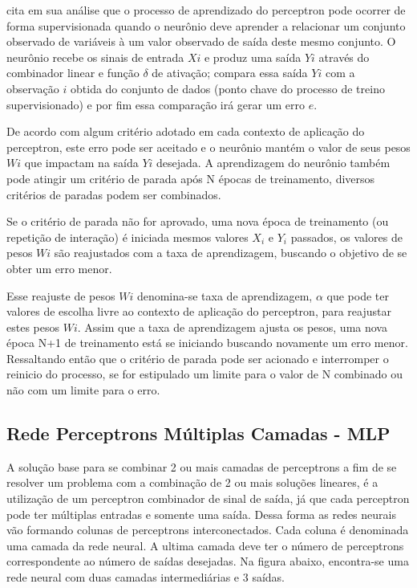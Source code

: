 \cite{Almeida2013} cita em sua análise que o processo de aprendizado do perceptron pode ocorrer de forma supervisionada quando o neurônio deve aprender a relacionar um conjunto observado de variáveis à um valor observado de saída deste mesmo conjunto. O neurônio recebe os sinais de entrada $Xi$ e produz uma saída $Yi$ através do combinador linear e função $\delta$ de ativação; compara essa saída $Yi$ com a observação $i$ obtida do conjunto de dados (ponto chave do processo de treino supervisionado) e por fim essa comparação irá gerar um erro $e$.
            
De acordo com algum critério adotado em cada contexto de aplicação do perceptron, este erro pode ser aceitado e o neurônio mantém o valor de seus pesos $Wi$ que impactam na saída $Yi$ desejada. A aprendizagem do neurônio também pode atingir um critério de parada após N épocas de treinamento, diversos critérios de paradas  podem ser combinados.  
            	
Se o critério de parada não for aprovado, uma nova época de treinamento (ou repetição de interação) é iniciada mesmos valores $X_i$ e $Y_i$ passados, os valores de pesos $Wi$ são reajustados com a taxa de aprendizagem, buscando o objetivo de se obter um erro menor.
            	
Esse reajuste de pesos $Wi$ denomina-se taxa de aprendizagem, $\alpha$ que pode ter valores de escolha livre ao contexto de aplicação do perceptron, para reajustar estes pesos $Wi$. Assim que a taxa de aprendizagem ajusta os pesos, uma nova época N+1 de treinamento está se iniciando buscando novamente um erro menor. Ressaltando então que o critério de parada pode ser acionado e interromper o reinicio do processo, se for estipulado um limite para o valor de N combinado ou não com um limite para o erro. 
            	
\subsection{Rede Perceptrons Múltiplas Camadas - MLP}
  	       
  	       A solução base para se combinar 2 ou mais camadas de perceptrons a fim de se resolver um problema com a combinação de 2 ou mais soluções lineares, é a utilização de um perceptron combinador de sinal de saída, já que cada perceptron pode ter múltiplas entradas e somente uma saída. Dessa forma as redes neurais vão formando colunas de perceptrons interconectados. Cada coluna é denominada uma camada da rede neural. A ultima camada deve ter o número de perceptrons correspondente ao número de saídas desejadas. Na figura abaixo, encontra-se uma rede neural com duas camadas intermediárias e 3 saídas.
  	       
